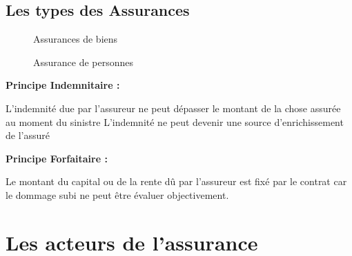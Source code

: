     \subsection{Les types des Assurances}
 \begin{figure}[H]
\centering
{}
\caption{Assurances de biens}
\label{fig:Mod-Enseig}
\end{figure}   

\begin{figure}[H]
\centering
{}
\caption{Assurance de personnes}
\label{fig:Mod-Enseig}
\end{figure}
\newpage
    
    \textbf{Principe Indemnitaire :}
    
    L’indemnité
due par l’assureur ne peut dépasser le
montant de la chose assurée au moment du sinistre
L’indemnité ne peut devenir une source d’enrichissement
de l’assuré
    
   
    \textbf{Principe Forfaitaire :}
    
    Le
montant du capital ou de la rente dû par l’assureur
est fixé par le contrat car le dommage subi ne peut
être évaluer objectivement.

\section{Les acteurs de l’assurance}    
